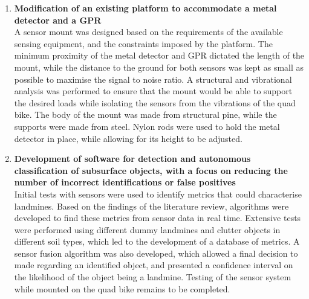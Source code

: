 \documentclass[main.tex]{subfiles}
\begin{document}
\begin{enumerate}
\item \textbf{Modification of an existing platform to accommodate a metal detector and a GPR}\\ 
A sensor mount was designed based on the requirements of the available sensing equipment, and the constraints imposed by the platform. The minimum proximity of the metal detector and GPR dictated the length of the mount, while the distance to the ground for both sensors was kept as small as possible to maximise the signal to noise ratio. A structural and vibrational analysis was performed to ensure that the mount would be able to support the desired loads while isolating the sensors from the vibrations of the quad bike. The body of the mount was made from structural pine, while the supports were made from steel. Nylon rods were used to hold the metal detector in place, while allowing for its height to be adjusted.   

\item \textbf{Development of software for detection and autonomous classification of subsurface objects, with a focus on reducing the number of incorrect identifications or false positives}\\ 
Initial tests with sensors were used to identify metrics that could characterise landmines. Based on the findings of the literature review, algorithms were developed to find these metrics from sensor data in real time. Extensive tests were performed using different dummy landmines and clutter objects in different soil types, which led to the development of a database of metrics. A sensor fusion algorithm was also developed, which allowed a final decision to made regarding an identified object, and presented a confidence interval on the likelihood of the object being a landmine. Testing of the sensor system while mounted on the quad bike remains to be completed.
\end{enumerate}
\end{document}

